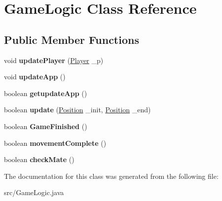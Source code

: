 \hypertarget{class_game_logic}{\section{Game\-Logic Class Reference}
\label{class_game_logic}
}
\subsection*{Public Member Functions}
\begin{DoxyCompactItemize}
\item 
\hypertarget{class_game_logic_ab3a9a378dc6771bf80787eb3f7813e49}{void {\bfseries update\-Player} (\hyperlink{class_basic___objects_1_1_player}{Player} \-\_\-p)}\label{class_game_logic_ab3a9a378dc6771bf80787eb3f7813e49}

\item 
\hypertarget{class_game_logic_a281db5c4df0f5d9c7a0a42a029fb79cf}{void {\bfseries update\-App} ()}\label{class_game_logic_a281db5c4df0f5d9c7a0a42a029fb79cf}

\item 
\hypertarget{class_game_logic_a77f8b1d5fad85c98ef3b562d138761dd}{boolean {\bfseries getupdate\-App} ()}\label{class_game_logic_a77f8b1d5fad85c98ef3b562d138761dd}

\item 
\hypertarget{class_game_logic_a16750c53bed78409f51cc8531f87728c}{boolean {\bfseries update} (\hyperlink{class_basic___objects_1_1_position}{Position} \-\_\-init, \hyperlink{class_basic___objects_1_1_position}{Position} \-\_\-end)}\label{class_game_logic_a16750c53bed78409f51cc8531f87728c}

\item 
\hypertarget{class_game_logic_a51098caf4637d2cf22564ffd4240833c}{boolean {\bfseries Game\-Finished} ()}\label{class_game_logic_a51098caf4637d2cf22564ffd4240833c}

\item 
\hypertarget{class_game_logic_a18199d3792eaa46a205c80e899cb2f5d}{boolean {\bfseries movement\-Complete} ()}\label{class_game_logic_a18199d3792eaa46a205c80e899cb2f5d}

\item 
\hypertarget{class_game_logic_a9f71589900e8f80b7d67091144cc7c39}{boolean {\bfseries check\-Mate} ()}\label{class_game_logic_a9f71589900e8f80b7d67091144cc7c39}

\end{DoxyCompactItemize}


The documentation for this class was generated from the following file\-:\begin{DoxyCompactItemize}
\item 
src/Game\-Logic.\-java\end{DoxyCompactItemize}
